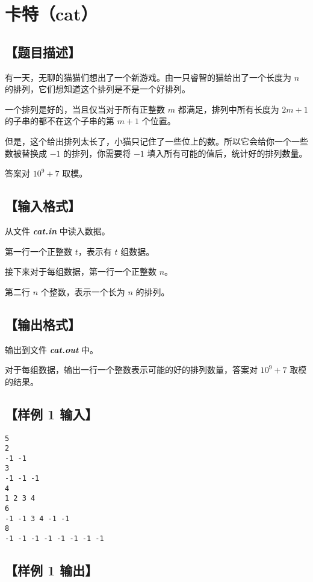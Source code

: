 \documentclass[UTF8]{ctexart}
\newcommand\file[1]{\textbf{\textit{#1}}}
\newcommand\bfdot[1]{\textbf{\CJKunderdot{#1}}}
\newcommand{\newproblem}[1]{\section{#1}\markboth{#1}{}}
\begin{document}
	\newpage
	
	\newproblem{卡特（cat）}
	
	\subsection[题目描述]{【题目描述】}

    有一天，无聊的猫猫们想出了一个新游戏。由一只睿智的猫给出了一个长度为 $n$ 的排列，它们想知道这个排列是不是一个好排列。

	一个排列是好的，当且仅当对于所有正整数 $m$ 都满足，排列中所有长度为 $2m+1$ 的子串的\bfdot{中位数}都不在这个子串的第 $m+1$ 个位置。

	但是，这个给出排列太长了，小猫只记住了一些位上的数。所以它会给你一个一些数被替换成 $−1$ 的排列，你需要将 $−1$ 填入所有可能的值后，统计好的排列数量。

	答案对 $10^9+7$ 取模。

	\subsection[输入格式]{【输入格式】}
	
	从文件 \file{cat.in} 中读入数据。	
	
	第一行一个正整数  $t$，表示有 $t$ 组数据。

	接下来对于每组数据，第一行一个正整数 $n$。

	第二行 $n$ 个整数，表示一个长为 $n$ 的排列。
	
	\subsection[输出格式]{【输出格式】}
	
	输出到文件 \file{cat.out} 中。
	
	对于每组数据，输出一行一个整数表示可能的好的排列数量，答案对 $10^9+7$ 取模的结果。
	
	\subsection[样例 1 输入]{【样例 1 输入】}
	
	\begin{lstlisting}
5
2
-1 -1
3
-1 -1 -1
4
1 2 3 4
6
-1 -1 3 4 -1 -1
8
-1 -1 -1 -1 -1 -1 -1 -1
	\end{lstlisting}
	
	\subsection[样例 1 输出]{【样例 1 输出】}
	
\end{document}
